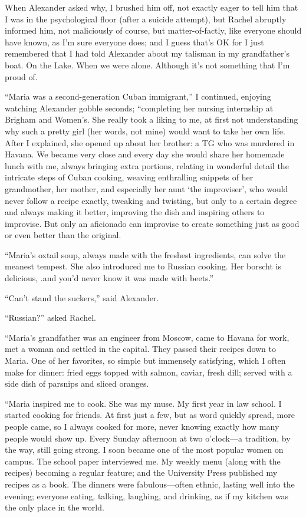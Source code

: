 When Alexander asked why, I brushed him off, not exactly eager to tell
him that I was in the psychological floor (after a suicide attempt), but
Rachel abruptly informed him, not maliciously of course, but
matter-of-factly, like everyone should have known, as I'm sure everyone
does; and I guess that's OK for I just remembered that I had told
Alexander about my talisman in my grandfather's boat. On the Lake. When
we were alone. Although it's not something that I'm proud of.

``Maria was a second-generation Cuban immigrant,'' I continued, enjoying
watching Alexander gobble seconds; ``completing her nursing internship
at Brigham and Women's. She really took a liking to me, at first not
understanding why such a pretty girl (her words, not mine) would want to
take her own life. After I explained, she opened up about her brother: a
TG who was murdered in Havana. We became very close and every day she
would share her homemade lunch with me, always bringing extra portions,
relating in wonderful detail the intricate steps of Cuban cooking,
weaving enthralling snippets of her grandmother, her mother, and
especially her aunt `the improviser', who would never follow a recipe
exactly, tweaking and twisting, but only to a certain degree and always
making it better, improving the dish and inspiring others to improvise.
But only an aficionado can improvise to create something just as good or
even better than the original.

``Maria's oxtail soup, always made with the freshest ingredients, can
solve the meanest tempest. She also introduced me to Russian cooking.
Her borscht is delicious, .and you'd never know it was made with
beets.''

``Can't stand the suckers,'' said Alexander.

``Russian?'' asked Rachel.

``Maria's grandfather was an engineer from Moscow, came to Havana for
work, met a woman and settled in the capital. They passed their recipes
down to Maria. One of her favorites, so simple but immensely satisfying,
which I often make for dinner: fried eggs topped with salmon, caviar,
fresh dill; served with a side dish of parsnips and sliced oranges.

``Maria inspired me to cook. She was my muse. My first year in law
school. I started cooking for friends. At first just a few, but as word
quickly spread, more people came, so I always cooked for more, never
knowing exactly how many people would show up. Every Sunday afternoon at
two o'clock---a tradition, by the way, still going strong. I soon became
one of the most popular women on campus. The school paper interviewed
me. My weekly menu (along with the recipes) becoming a regular feature;
and the University Press published my recipes as a book. The dinners
were fabulous---often ethnic, lasting well into the evening; everyone
eating, talking, laughing, and drinking, as if my kitchen was the only
place in the world.

